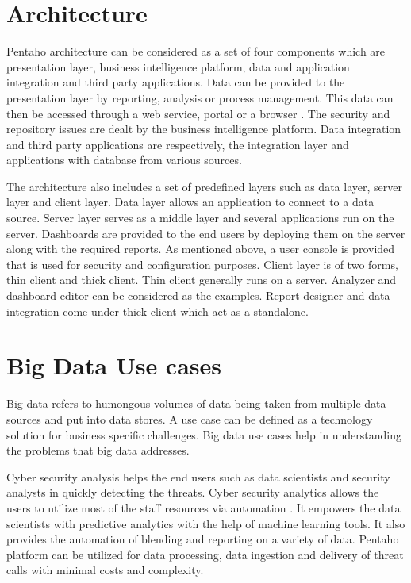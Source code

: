 \documentclass[9pt,twocolumn,twoside]{styles/osajnl}
\begin{document}
\section{Architecture}

Pentaho architecture can be considered as a set of four components
which are presentation layer, business intelligence platform, data and
application integration and third party applications. Data can be
provided to the presentation layer by reporting, analysis or process
management. This data can then be accessed through a web service,
portal or a browser \cite{pent7}. The security and repository issues
are dealt by the business intelligence platform. Data integration and
third party applications are respectively, the integration layer and
applications with database from various sources.

The architecture also includes a set of predefined layers such as data
layer, server layer and client layer. Data layer allows an application
to connect to a data source. Server layer serves as a middle layer and
several applications run on the server. Dashboards are provided to the
end users by deploying them on the server along with the required
reports. As mentioned above, a user console is provided that is used
for security and configuration purposes. Client layer is of two forms,
thin client and thick client. Thin client generally runs on a
server. Analyzer and dashboard editor can be considered as the
examples. Report designer and data integration come under thick client
which act as a standalone.

\section{Big Data Use cases}

Big data refers to humongous volumes of data being taken from multiple
data sources and put into data stores. A use case can be defined as a
technology solution for business specific challenges. Big data use
cases help in understanding the problems that big data addresses.

Cyber security analysis helps the end users such as data scientists
and security analysts in quickly detecting the threats. Cyber security
analytics allows the users to utilize most of the staff resources via
automation \cite{pent8}. It empowers the data scientists with
predictive analytics with the help of machine learning tools. It also
provides the automation of blending and reporting on a variety of
data. Pentaho platform can be utilized for data processing, data
ingestion and delivery of threat calls with minimal costs and
complexity.
\end{document}
